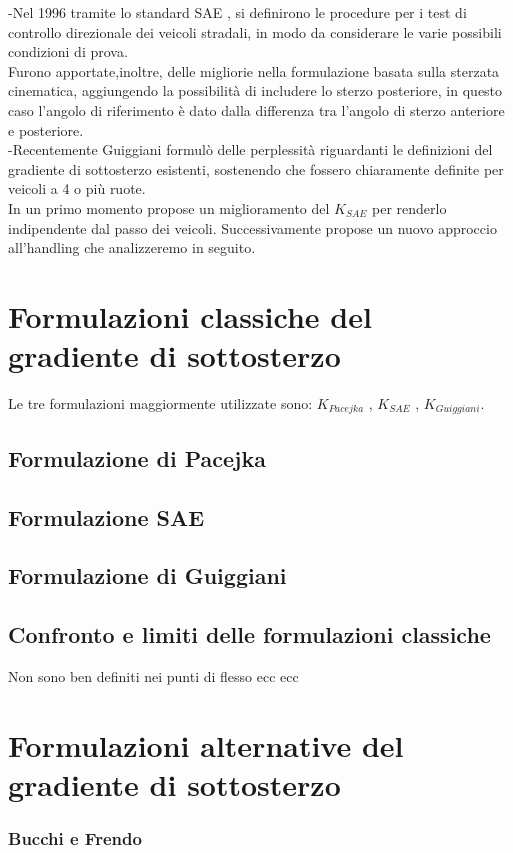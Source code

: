 -Nel 1996 tramite lo standard SAE \cite{J266_201811}, si definirono le procedure per i test di controllo direzionale dei veicoli stradali, in modo da considerare le varie possibili condizioni di prova. \\
Furono apportate,inoltre, delle migliorie nella formulazione basata sulla sterzata cinematica, aggiungendo la possibilità di includere lo sterzo posteriore, in questo caso l'angolo di riferimento è dato dalla differenza tra l'angolo di sterzo anteriore e posteriore.\\
-Recentemente Guiggiani formulò delle perplessità riguardanti le definizioni del gradiente di sottosterzo esistenti, sostenendo che fossero chiaramente definite per veicoli a 4 o più ruote.\\
In un primo momento propose un miglioramento del $K_{SAE}$ per renderlo indipendente dal passo dei veicoli.
Successivamente propose un nuovo approccio all'handling che analizzeremo in seguito.

\section{Formulazioni classiche del gradiente di sottosterzo}
Le tre formulazioni maggiormente utilizzate sono: $K_{Pacejka}$ , $K_{SAE}$ , $K_{Guiggiani}$.
\subsection{Formulazione di Pacejka}

\subsection{Formulazione SAE}

\subsection{Formulazione di Guiggiani}

\subsection{Confronto e limiti delle formulazioni classiche}
Non sono ben definiti nei punti di flesso ecc ecc

\section{Formulazioni alternative del gradiente di sottosterzo}
\subsubsection{Bucchi e Frendo}

